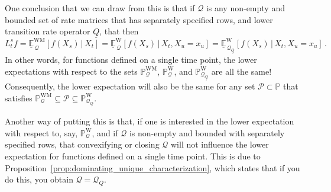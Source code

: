\documentclass[10pt,a4paper]{paper}
\theoremstyle{definition}
\newcommand{\processes}{\mathbb{P}}
\newcommand{\wprocesses}{\processes^{\mathrm{W}}}
\newcommand{\wmprocesses}{\processes^{\mathrm{WM}}}
\newcommand{\rateset}{\mathcal{Q}}
\newcommand{\lrate}{\underline{Q}}
\begin{document}
One conclusion that we can draw from this is that if $\rateset$ is any non-empty and bounded set of rate matrices that has separately specified rows, and lower transition rate operator $\lrate$, that then
\begin{equation*}
L_{t}^sf = \underline{\mathbb{E}}_{\,\rateset}^{\mathrm{WM}}[f(X_s)\,\vert\,X_{t}] = \underline{\mathbb{E}}_{\,\rateset}^{\mathrm{W}}[f(X_s)\,\vert\,X_t,X_u=x_u] = \underline{\mathbb{E}}_{\,\rateset_{\lrate}}^{\mathrm{W}}[f(X_s)\,\vert\,X_t,X_u=x_u]\,.
\end{equation*}
In other words, for functions defined on a single time point, the lower expectations with respect to the sets $\wmprocesses_{\rateset}$, $\wprocesses_{\rateset}$, and $\wprocesses_{\rateset_{\lrate}}$ are all the same! Consequently, the lower expectation will also be the same for any set $\mathcal{P}\subset\processes$ that satisfies $\wmprocesses_\rateset \subseteq \mathcal{P} \subseteq \wprocesses_{\rateset_{\lrate}}$.

Another way of putting this is that, if one is interested in the lower expectation with respect to, say, $\wprocesses_{\rateset}$, and if $\rateset$ is non-empty and bounded with separately specified rows, that convexifying or closing $\rateset$ will not influence the lower expectation for functions defined on a single time point. This is due to Proposition~\ref{prop:dominating_unique_characterization}, which states that if you do this, you obtain $\rateset=\rateset_{\lrate}$.
\end{document}
